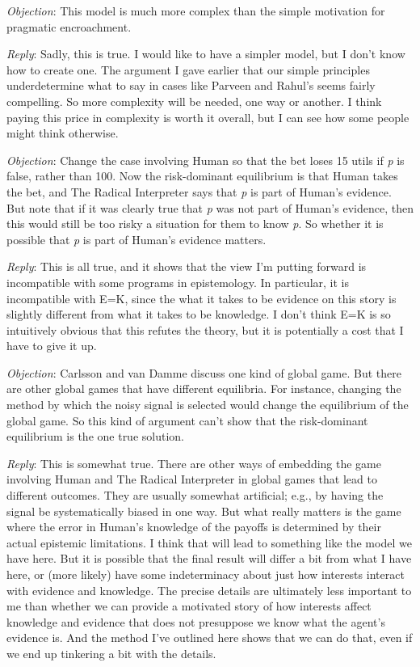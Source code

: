 \documentclass[
  10pt,
  letterpaper,
  DIV=11,
  numbers=noendperiod,
  twoside]{scrartcl}
\begin{document}
\emph{Objection}: This model is much more complex than the simple
motivation for pragmatic encroachment.

\emph{Reply}: Sadly, this is true. I would like to have a simpler model,
but I don't know how to create one. The argument I gave earlier that our
simple principles underdetermine what to say in cases like Parveen and
Rahul's seems fairly compelling. So more complexity will be needed, one
way or another. I think paying this price in complexity is worth it
overall, but I can see how some people might think otherwise.

\emph{Objection}: Change the case involving Human so that the bet loses
15 utils if \emph{p} is false, rather than 100. Now the risk-dominant
equilibrium is that Human takes the bet, and The Radical Interpreter
says that \emph{p} is part of Human's evidence. But note that if it was
clearly true that \emph{p} was not part of Human's evidence, then this
would still be too risky a situation for them to know \emph{p}. So
whether it is possible that \emph{p} is part of Human's evidence
matters.

\emph{Reply}: This is all true, and it shows that the view I'm putting
forward is incompatible with some programs in epistemology. In
particular, it is incompatible with E=K, since the what it takes to be
evidence on this story is slightly different from what it takes to be
knowledge. I don't think E=K is so intuitively obvious that this refutes
the theory, but it is potentially a cost that I have to give it up.

\emph{Objection}: Carlsson and van Damme discuss one kind of global
game. But there are other global games that have different equilibria.
For instance, changing the method by which the noisy signal is selected
would change the equilibrium of the global game. So this kind of
argument can't show that the risk-dominant equilibrium is the one true
solution.

\emph{Reply}: This is somewhat true. There are other ways of embedding
the game involving Human and The Radical Interpreter in global games
that lead to different outcomes. They are usually somewhat artificial;
e.g., by having the signal be systematically biased in one way. But what
really matters is the game where the error in Human's knowledge of the
payoffs is determined by their actual epistemic limitations. I think
that will lead to something like the model we have here. But it is
possible that the final result will differ a bit from what I have here,
or (more likely) have some indeterminacy about just how interests
interact with evidence and knowledge. The precise details are ultimately
less important to me than whether we can provide a motivated story of
how interests affect knowledge and evidence that does not presuppose we
know what the agent's evidence is. And the method I've outlined here
shows that we can do that, even if we end up tinkering a bit with the
details.
\end{document}
